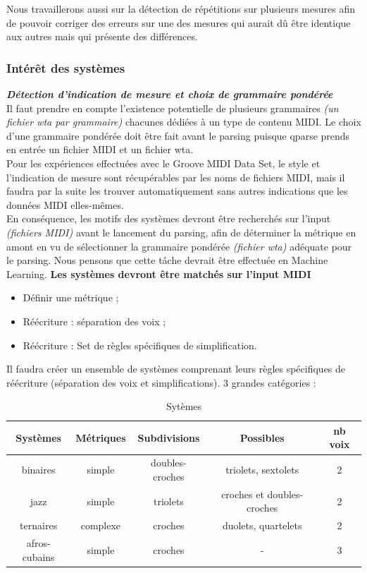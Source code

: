 Nous travaillerons aussi sur la détection de répétitions sur plusieurs mesures afin de pouvoir corriger des erreurs sur une des mesures qui aurait dû être identique aux autres mais qui présente des différences.

\subsubsection{Intérêt des systèmes}
\textit{\textbf{Détection d’indication de mesure et choix de grammaire pondérée}}\\
Il faut prendre en compte l’existence potentielle de plusieurs grammaires \textit{(un fichier wta par grammaire)} chacunes dédiées à un type de contenu MIDI. Le choix d’une grammaire pondérée doit être fait avant le parsing puisque qparse prends en entrée un fichier MIDI et un fichier wta.\\
Pour les expériences effectuées avec le Groove MIDI Data Set, le style et l’indication de mesure sont récupérables par les noms de fichiers MIDI, mais il faudra par la suite les trouver automatiquement sans autres indications que les données MIDI elles-mêmes.\\
En conséquence, les motifs des systèmes devront être recherchés sur l’input \textit{(fichiers MIDI)} avant le lancement du parsing, afin de déterminer la métrique en amont en vu de sélectionner la grammaire pondérée \textit{(fichier wta)} adéquate pour le parsing. Nous pensons que cette tâche devrait être effectuée en Machine Learning.
\textbf{Les systèmes devront être matchés sur l’input MIDI}
\begin{itemize}
	\item Définir une métrique ;
	\item Réécriture : séparation des voix ;
	\item Réécriture : Set de règles spécifiques de simplification.
\end{itemize}

Il faudra créer un ensemble de systèmes comprenant leurs règles spécifiques de réécriture (séparation des voix et simplifications).
3 grandes catégories :
\begin{table}[h]
	\centering
	\begin{tabular}{|c|c|c|c|c|} \hline
		Systèmes & Métriques & Subdivisions & Possibles & nb voix \\ \hline
		binaires & simple & doubles-croches & triolets, sextolets & 2 \\
		jazz & simple & triolets & croches et doubles-croches & 2 \\
		ternaires & complexe & croches & duolets, quartelets & 2 \\
		afros-cubains & simple & croches & - & 3 \\ \hline
	\end{tabular}
	\caption{Sytèmes}
\end{table}

